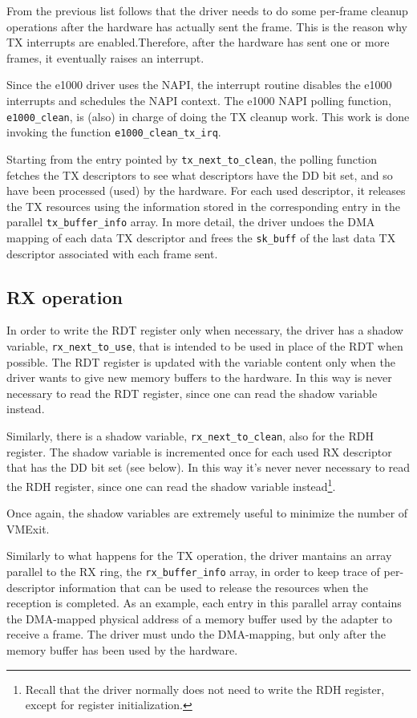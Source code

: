 From the previous list follows that the driver needs to do some per-frame cleanup operations after the hardware has actually sent the
frame. This is the reason why TX interrupts are enabled.Therefore, after the hardware has sent one or more frames, it eventually 
raises an interrupt.

Since the e1000 driver uses the NAPI, the interrupt routine disables the e1000 interrupts and schedules the NAPI context.
The e1000 NAPI polling function, \texttt{e1000\_clean}, is (also) in charge of doing the TX cleanup work. This work is done invoking
the function \texttt{e1000\_clean\_tx\_irq}.

Starting from the entry pointed by \texttt{tx\_next\_to\_clean}, the polling function fetches the TX descriptors to see what descriptors
have the DD bit set, and so have been processed (used) by the hardware. For each used descriptor, it releases the TX resources using the
information stored in the corresponding entry in the parallel \texttt{tx\_buffer\_info} array. In more detail, the driver undoes the DMA
mapping of each data TX descriptor and frees the \texttt{sk\_buff} of the last data TX descriptor associated with each frame sent.


\subsection{RX operation}
In order to write the RDT register only when necessary, the driver has a shadow variable, \texttt{rx\_next\_to\_use}, that is intended to
be used in place of the RDT when possible. The RDT register is updated with the variable content only when the driver wants to give new
memory buffers to the hardware. In this way is never necessary to read the RDT register, since one can read the shadow variable instead.

Similarly, there is a shadow variable, \texttt{rx\_next\_to\_clean}, also for the RDH register. The shadow variable is incremented
once for each used RX descriptor that has the DD bit set (see below). In this way it's never never necessary
to read the RDH register, since one can read the shadow variable instead\footnote{Recall that the driver normally does not need to write
the RDH register, except for register initialization.}.

Once again, the shadow variables are extremely useful to minimize the number of VMExit.

\vspace{0.5cm}

Similarly to what happens for the TX operation, the driver mantains an array parallel to the RX ring, the \texttt{rx\_buffer\_info} array,
in order to keep trace of per-descriptor information that can be used to release the resources when the reception is completed.
As an example, each entry in this parallel array contains the DMA-mapped physical address of a memory buffer used by the adapter to
receive a frame. The driver must undo the DMA-mapping, but only after the memory buffer has been used by the hardware.


